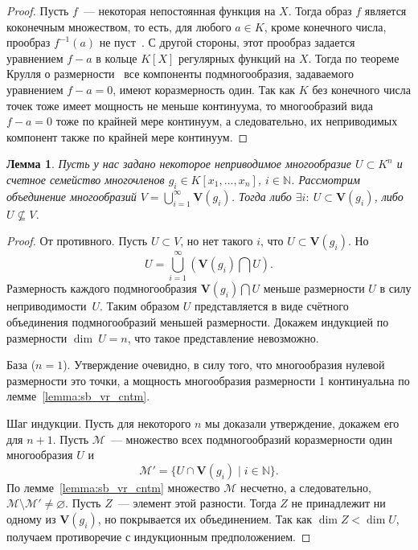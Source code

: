 \documentclass[16pt]{article}
\theoremstyle{plain1}
\newtheorem{lemma}[theorem1]{Лемма}
\theoremstyle{plain2}
\theoremstyle{plain}
\theoremstyle{plain3}
\theoremstyle{definition}
\theoremstyle{remark}
\begin{document}
\begin{proof}
Пусть $f$~--- некоторая
непостоянная функция на $X$. Тогда образ $f$ является
коконечным множеством, то есть, для любого $a\in K$, кроме конечного
числа, прообраз $f^{-1}(a)$ не пуст~\cite[глава 2, \S3, упр. 3.19]{Hartshorn}. С другой стороны,
этот прообраз задается уравнением $f-a$ в кольце $K[X]$
регулярных функций на $X$. Тогда по теореме Крулля о размерности~\cite[Chapter~5,
Section~12, Theorem~18]{Matsumura} все
компоненты подмногообразия, задаваемого уравнением $f-a=0$, имеют
коразмерность один. Так как $K$ без конечного числа точек тоже
имеет мощность не меньше континуума, то многообразий вида $f-a=0$ тоже по крайней мере континуум, а следовательно, их
неприводимых компонент также по крайней мере континуум.
\end{proof}

\begin{lemma} \label{lemma:o vlojenii}
Пусть у нас задано некоторое неприводимое многообразие
$U\subset K^n$ и счетное семейство многочленов
$g_i\in K[x_1,\ldots,x_n]$, $i \in \mathbb{N}$. Рассмотрим объединение
многообразий $V=\bigcup\limits
_{i=1}^{\infty}\mathbf{V}(g_i)$. Тогда либо
$\exists i:\: U \subset \mathbf{V}(g_i)$, либо
$U\nsubseteq V$.
\end{lemma}

\begin{proof}
От противного. Пусть $U\subset V$, но нет такого
$i$, что $U \subset \mathbf{V}(g_i)$.
Но
$$
U=\bigcup\limits_{i=1}^{\infty}\left(\mathbf{V}(g_i)\bigcap U\right).
$$
Размерность каждого подмногообразия
$\mathbf{V}(g_i)\bigcap U$ меньше
размерности $U$ в силу неприводимости~$U$.
Таким образом $U$ представляется в виде счётного объединения
подмногообразий меньшей размерности. 
Докажем индукцией
по размерности $\dim~U=n$,
что такое представление невозможно.

База ($n=1$). Утверждение очевидно, в силу того, что многообразия
нулевой размерности это точки, а мощность многообразия
размерности 1 континуальна по лемме~\ref{lemma:sb_vr_cntm}.

Шаг индукции. Пусть для некоторого $n$ мы доказали утверждение, докажем его для $n+1$.
Пусть $\mathcal M$~--- множество всех подмногообразий коразмерности
один многообразия $U$ и
$$
\mathcal M' = \{ U\cap \mathbf{V}(g_i)\mid i\in \mathbb N \}.
$$
По лемме~\ref{lemma:sb_vr_cntm} множество $\mathcal M$ несчетно, а
следовательно, $\mathcal M\setminus\mathcal M'\neq \varnothing$.
Пусть $Z$~--- элемент этой разности. Тогда $Z$ не принадлежит ни
одному из $\mathbf{V}(g_i)$, но покрывается их
объединением. Так как $\dim Z<\dim U$, получаем
противоречие с индукционным предположением.
\end{proof}
\end{document}
